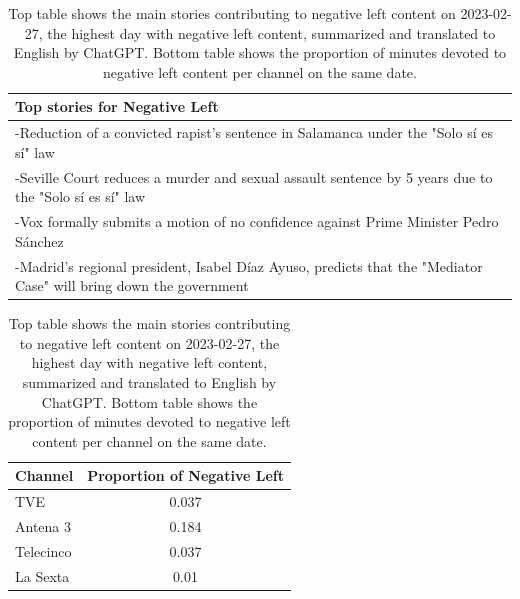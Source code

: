 \documentclass[12pt]{article}
\begin{document}
		\begin{table}[!htb]
		\centering
		\begin{tabular}{p{}}
			\toprule
			\textbf{Top stories for  Negative Left}  \\
			\midrule
			-Reduction of a convicted rapist’s sentence in Salamanca under the "Solo sí es sí" law  \\
			-Seville Court reduces a murder and sexual assault sentence by 5 years due to the "Solo sí es sí" law  \\
			-Vox formally submits a motion of no confidence against Prime Minister Pedro Sánchez  \\
			-Madrid’s regional president, Isabel Díaz Ayuso, predicts that the "Mediator Case" will bring down the government  \\
			\bottomrule
		\end{tabular}
		\begin{tabular}{l c}
			\toprule
			\textbf{Channel} & \textbf{Proportion of Negative Left} \\
			\midrule
			TVE & 0.037 \\
			Antena 3  & 0.184 \\
			Telecinco  & 0.037 \\
			La Sexta  & 0.01 \\
			\bottomrule
		\end{tabular}
		\caption{Top table shows the main stories contributing to negative left content on 2023-02-27, the highest day with negative left content,  summarized and translated to English by ChatGPT. Bottom table shows the proportion of minutes devoted to negative left content per channel on the same date.}
		\label{tab:neg_left_channels}
	\end{table}
	
\end{document}
